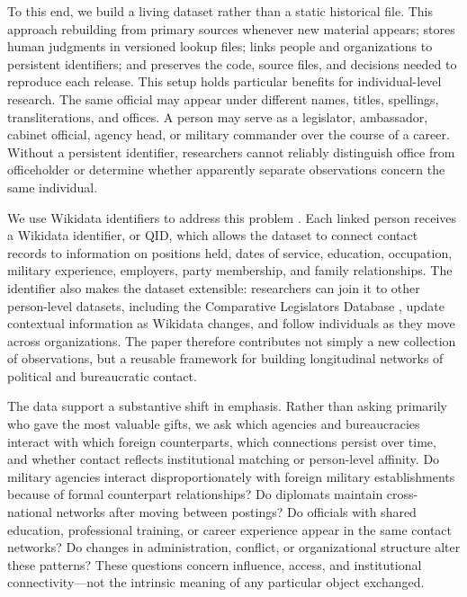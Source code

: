 \documentclass[11pt]{article}
\begin{document}
To this end, we build a living dataset rather than a static historical file. This approach rebuilding from primary sources whenever new material appears; stores human judgments in versioned lookup files; links people and organizations to persistent identifiers; and preserves the code, source files, and decisions needed to reproduce each release. This setup holds particular benefits for individual-level research. The same official may appear under different names, titles, spellings, transliterations, and offices. A person may serve as a legislator, ambassador, cabinet official, agency head, or military commander over the course of a career. Without a persistent identifier, researchers cannot reliably distinguish office from officeholder or determine whether apparently separate observations concern the same individual.

We use Wikidata identifiers to address this problem \citep{vrandecic2014wikidata}. Each linked person receives a Wikidata identifier, or QID, which allows the dataset to connect contact records to information on positions held, dates of service, education, occupation, military experience, employers, party membership, and family relationships. The identifier also makes the dataset extensible: researchers can join it to other person-level datasets, including the Comparative Legislators Database \citep[CLD;][]{gobel2022cld}, update contextual information as Wikidata changes, and follow individuals as they move across organizations. The paper therefore contributes not simply a new collection of observations, but a reusable framework for building longitudinal networks of political and bureaucratic contact.

The data support a substantive shift in emphasis. Rather than asking primarily who gave the most valuable gifts, we ask which agencies and bureaucracies interact with which foreign counterparts, which connections persist over time, and whether contact reflects institutional matching or person-level affinity. Do military agencies interact disproportionately with foreign military establishments because of formal counterpart relationships? Do diplomats maintain cross-national networks after moving between postings? Do officials with shared education, professional training, or career experience appear in the same contact networks? Do changes in administration, conflict, or organizational structure alter these patterns? These questions concern influence, access, and institutional connectivity—not the intrinsic meaning of any particular object exchanged.
\end{document}
